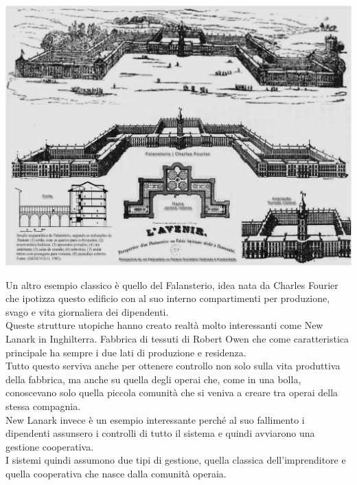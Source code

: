 \documentclass[a4paper,12pt, oneside]{book}
\begin{document}
 \begin{center}
   \includegraphics[width=0.6\linewidth]{"immagini/Falansterio"}
 \end{center}
Un altro esempio classico è quello del Falansterio, idea nata da Charles Fourier che ipotizza questo edificio con al suo interno compartimenti per produzione, svago e vita giornaliera dei dipendenti.\\
    Queste strutture utopiche hanno creato realtà molto interessanti come New Lanark in Inghilterra. Fabbrica di tessuti di Robert Owen che come caratteristica principale ha sempre i due lati di produzione e residenza.\\
    Tutto questo serviva anche per ottenere controllo non solo sulla vita produttiva della fabbrica, ma anche su quella degli operai che, come in una bolla, conoscevano solo quella piccola comunità che si veniva a creare tra operai della stessa compagnia.\\
    New Lanark invece è un esempio interessante perché al suo fallimento i dipendenti assunsero i controlli di tutto il sistema e quindi avviarono una gestione cooperativa.\\
    I sistemi quindi assumono due tipi di gestione, quella classica dell'imprenditore e quella cooperativa che nasce dalla comunità operaia.\\
\end{document}
